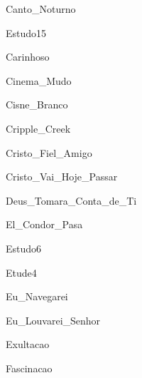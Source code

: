 \documentclass{scrartcl}
\begin{document}

{Canto_Noturno}


{Estudo15}


{Carinhoso}


{Cinema_Mudo}


{Cisne_Branco}


{Cripple_Creek}


{Cristo_Fiel_Amigo}


{Cristo_Vai_Hoje_Passar}


{Deus_Tomara_Conta_de_Ti}


{El_Condor_Pasa}


{Estudo6}


{Etude4}


{Eu_Navegarei}


{Eu_Louvarei_Senhor}


{Exultacao}


{Fascinacao}
\end{document}

